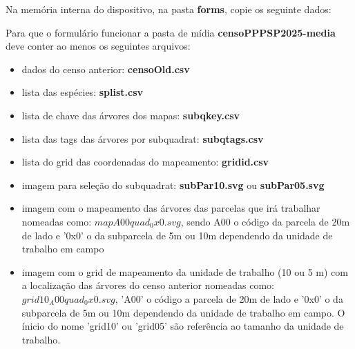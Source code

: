 \documentclass[12pt, a4paper]{article} %
\begin{document}

Na memória interna do dispositivo, na pasta  \textbf{forms}, copie os seguinte dados:

\begin{center}
\end{center}



Para que o formulário funcionar a pasta de mídia \textbf{censoPPPSP2025-media} deve conter ao menos os seguintes arquivos:
\begin{itemize}
\item dados do censo anterior: \textbf{censoOld.csv} 
\item lista das espécies: \textbf{splist.csv}
\item lista de chave das árvores dos mapas: \textbf{subqkey.csv}
\item lista das tags das árvores por subquadrat: \textbf{subqtags.csv}
\item lista do grid das coordenadas do mapeamento: \textbf{gridid.csv}
\item imagem para seleção do subquadrat: \textbf{subPar10.svg} ou \textbf{subPar05.svg}
\item imagem com o mapeamento das árvores das parcelas que irá trabalhar nomeadas como: \textbf{$mapA00quad_0x0.svg$}, sendo A00 o código da parcela de 20m de lado e '0x0' o da subparcela de 5m ou 10m dependendo da unidade de trabalho em campo
\item imagem com o grid de mapeamento da unidade de trabalho (10 ou 5 m) com a localização das árvores do censo anterior nomeadas como: \textbf{$grid10_A00quad_0x0.svg$}, 'A00' o código a parcela de 20m de lado e '0x0' o da subparcela de 5m ou 10m dependendo da unidade de trabalho em campo. O ínicio do nome 'grid10' ou 'grid05' são referência ao tamanho da unidade de trabalho.
\end{itemize}
\end{document}
